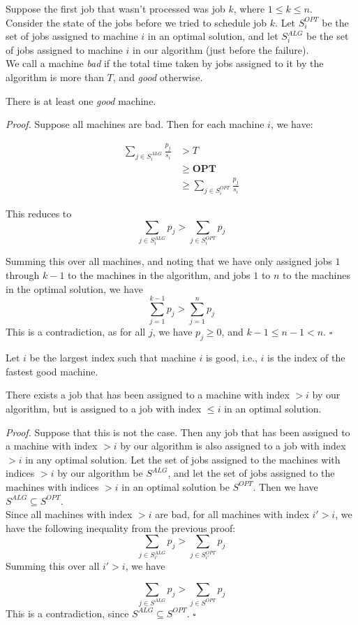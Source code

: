 \documentclass[a4paper]{article}
\newenvironment{proof}{\begin{breakbox}\textit{Proof.}}{\hfill$\square$\end{breakbox}}
\newcommand{\nl}{\vspace{0.2cm}\\}
\newcommand{\OPT}{\mathbf{OPT}}
\begin{document}
Suppose the first job that wasn't processed was job $k$, where $1 \le k \le n$.\nl
Consider the state of the jobs before we tried to schedule job $k$. Let $S_i^{OPT}$ be the set of jobs assigned to machine $i$ in an optimal solution, and let $S_i^{ALG}$ be the set of jobs assigned
to machine $i$ in our algorithm (just before the failure).\nl
We call a machine \emph{bad} if the total time taken by jobs assigned to it by the algorithm is more than $T$, and \emph{good} otherwise.\nl
\begin{claim}
    There is at least one \emph{good} machine.
\end{claim}
\begin{proof}
    Suppose all machines are bad. Then for each machine $i$, we have:

    \begin{align*}
        \sum_{j \in S_i^{ALG}} \frac{p_j}{s_i} &> T\\
                                    &\ge \OPT\\
                                    &\ge \sum_{j \in S_i^{OPT}} \frac{p_j}{s_i}
    \end{align*}

    This reduces to
    $$
    \sum_{j \in S_i^{ALG}} p_j > \sum_{j \in S_i^{OPT}} p_j
    $$

    Summing this over all machines, and noting that we have only assigned jobs $1$ through $k - 1$ to the machines in the algorithm, and jobs $1$ to $n$ to the machines in the optimal solution,
    we have
    $$
    \sum_{j = 1}^{k - 1} p_j > \sum_{j = 1}^{n} p_j
    $$
    This is a contradiction, as for all $j$, we have $p_j \ge 0$, and $k - 1 \le n - 1 < n$.
\end{proof}
Let $i$ be the largest index such that machine $i$ is good, i.e., $i$ is the index of the fastest good machine.\nl
\begin{claim}
    There exists a job that has been assigned to a machine with index $> i$ by our algorithm, but is assigned to a job with index $\le i$ in an optimal solution.
\end{claim}
\begin{proof}
    Suppose that this is not the case. Then any job that has been assigned to a machine with index $> i$ by our algorithm is also assigned to a job with index $> i$ in any optimal solution. Let
    the set of jobs assigned to the machines with indices $> i$ by our algorithm be $S^{ALG}$, and let the set of jobs assigned to the machines with indices $> i$ in an optimal solution be
    $S^{OPT}$. Then we have $S^{ALG} \subseteq S^{OPT}$.\nl
    Since all machines with index $> i$ are bad, for all machines with index $i' > i$, we have the following inequality from the previous proof:
    $$
    \sum_{j \in S_{i'}^{ALG}} p_j > \sum_{j \in S_{i'}^{OPT}} p_j
    $$
    Summing this over all $i' > i$, we have

    $$
    \sum_{j \in S^{ALG}} p_j > \sum_{j \in S^{OPT}} p_j
    $$
    This is a contradiction, since $S^{ALG} \subseteq S^{OPT}$.
\end{proof}
\end{document}
